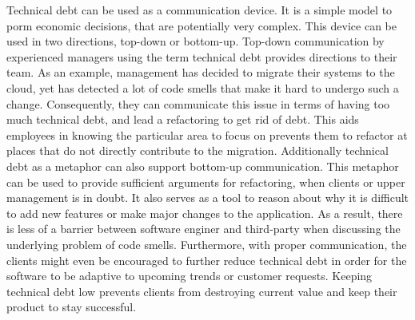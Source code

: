 Technical debt can be used as a communication device. 
It is a simple model to porm economic decisions, 
	that are potentially very complex.
This device can be used in two directions, top-down or bottom-up.
Top-down communication by experienced managers 
	using the term technical debt provides directions to their team.
As an example, management has decided to migrate their systems to the cloud, 
	yet has detected a lot of code smells 
	that make it hard to undergo such a change. 
Consequently, they can communicate this issue in terms of 
	having too much technical debt, and lead a refactoring to get rid of debt.
This aids employees in knowing the particular area 
	to focus on prevents them to refactor at places 
	that do not directly contribute to the migration.
Additionally technical debt as a metaphor 
	can also support bottom-up communication.
This metaphor can be used to provide sufficient arguments for refactoring, 
	when clients or upper management is in doubt.
It also serves as a tool to reason about 
	why it is difficult to add new features or 
	make major changes to the application. 
As a result, there is less of a barrier between 
	software enginer and third-party when discussing the 
	underlying problem of code smells. 
Furthermore, with proper communication, 
	the clients might even be encouraged to further reduce 
	technical debt in order for the software to be adaptive to 
	upcoming trends or customer requests. 
Keeping technical debt low prevents clients from destroying current value 
	and keep their product to stay successful.
